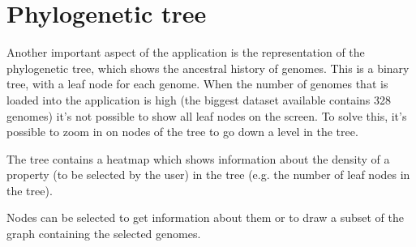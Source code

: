 \section{Phylogenetic tree}
\par
Another important aspect of the application is the representation of the phylogenetic tree, which shows the ancestral history of genomes. This is a binary tree, with a leaf node for each genome. When the number of genomes that is loaded into the application is high (the biggest dataset available contains 328 genomes) it’s not possible to show all leaf nodes on the screen. To solve this, it’s possible to zoom in on nodes of the tree to go down a level in the tree.
\par
The tree contains a heatmap which shows information about the density of a property (to be selected by the user) in the tree (e.g. the number of leaf nodes in the tree).
\par
Nodes can be selected to get information about them or to draw a subset of the graph containing the selected genomes.